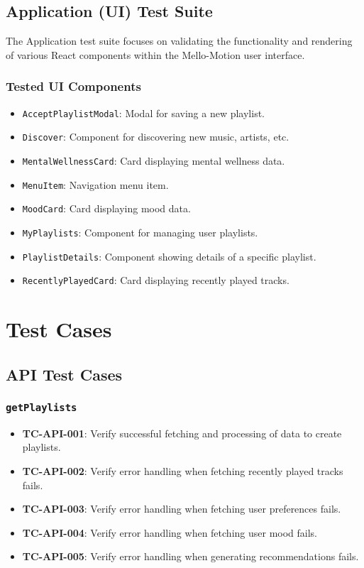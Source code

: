 \documentclass{article}
\begin{document}
\subsection{Application (UI) Test Suite}
The Application test suite focuses on validating the functionality and rendering of various React components within the Mello-Motion user interface.

\subsubsection{Tested UI Components}
\begin{itemize}
    \item \texttt{AcceptPlaylistModal}: Modal for saving a new playlist.
    \item \texttt{Discover}: Component for discovering new music, artists, etc.
    \item \texttt{MentalWellnessCard}: Card displaying mental wellness data.
    \item \texttt{MenuItem}: Navigation menu item.
    \item \texttt{MoodCard}: Card displaying mood data.
    \item \texttt{MyPlaylists}: Component for managing user playlists.
    \item \texttt{PlaylistDetails}: Component showing details of a specific playlist.
    \item \texttt{RecentlyPlayedCard}: Card displaying recently played tracks.
\end{itemize}

\section{Test Cases}

\subsection{API Test Cases}

\subsubsection{\texttt{getPlaylists}}
\begin{itemize}
    \item \textbf{TC-API-001}: Verify successful fetching and processing of data to create playlists.
    \item \textbf{TC-API-002}: Verify error handling when fetching recently played tracks fails.
    \item \textbf{TC-API-003}: Verify error handling when fetching user preferences fails.
    \item \textbf{TC-API-004}: Verify error handling when fetching user mood fails.
    \item \textbf{TC-API-005}: Verify error handling when generating recommendations fails.
\end{itemize}
\end{document}
